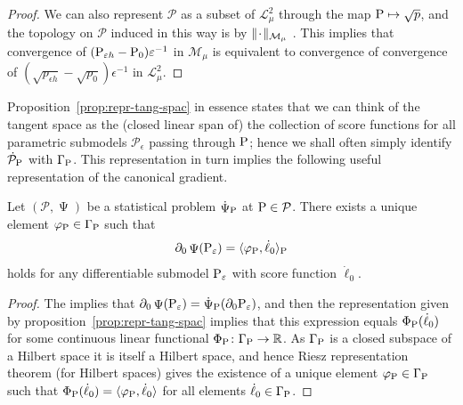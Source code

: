 \documentclass[a4,danish]{article}
\DeclareMathOperator{\TT}{\Psi}
\begin{document}
\begin{proof}
   We can also
  represent $\mathcal{P}$ as a subset of $\mathcal{L}_{\mu}^2$ through the map
  $\P \mapsto \sqrt{p}$, and the topology on $\mathcal{P}$ induced in this way is  by
  $\Vert \blank \Vert_{\mathcal{M}_{\mu}}$ \citep{bickel1993efficient}. This implies that
  convergence of $(\P_{\epsilon h} - \P_{0})\epsilon^{-1}$ in $\mathcal{M}_{\mu}$ is equivalent to
  convergence of convergence of $(\sqrt{p_{\epsilon h}} - \sqrt{p_{0}})\epsilon^{-1}$ in
  $\mathcal{L}_{\mu}^2$. 
\end{proof}

Proposition~\ref{prop:repr-tang-spac} in essence states that we can think of the tangent space as
the (closed linear span of) the collection of score functions for all parametric submodels
$\mathcal{P}_{\epsilon}$ passing through $\P$; hence we shall often simply identify
$\dot{\mathcal{P}}_{\P}$ with $\Gamma_{\P}$. This representation in turn implies the following
useful representation of the canonical gradient.

\begin{proposition}
  \label{prop:repr-can-gradient}
  Let $(\mathcal{P}, \TT)$ be a statistical problem 
  $\dot{\mathcal{\TT}}_{\P}$ at $\P \in \mathcal{P}$. There exists a
  unique element $\phi_{\P} \in \Gamma_{\P}$ such that
  \begin{equation}
    \label{eq:2}
    \partial_0 \TT(\P_{\epsilon})
    = \langle \phi_{\P}, \dot{\ell}_0 \rangle_{\P}
  \end{equation}
  holds for any differentiable submodel $\P_{\epsilon}$ with score function $\dot{\ell}_0$.
\end{proposition}

\begin{proof}
  The  implies that
  $\partial_0 \TT(\P_{\epsilon}) = \dot{\TT}_{\P}(\partial_0
  \P_{\epsilon})$, and then the representation given by
  proposition~\ref{prop:repr-tang-spac} implies that this expression
  equals $\Phi_{\P}(\dot{\ell}_0)$ for some continuous linear
  functional $\Phi_{\P} \colon \Gamma_{\P} \rightarrow \R$. As
  $\Gamma_{\P}$ is a closed subspace of a Hilbert space it is itself a
  Hilbert space, and hence Riesz representation theorem (for Hilbert
  spaces) gives the existence of a unique element
  $\phi_{\P} \in \Gamma_{\P}$ such that
  $\Phi_{\P}(\dot{\ell}_0) = \langle\phi_{\P}, \dot{\ell}_0\rangle$
  for all elements $\dot{\ell}_0 \in \Gamma_{\P}$.
\end{proof}
\end{document}
